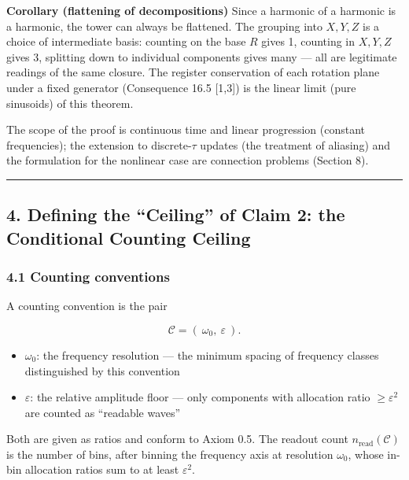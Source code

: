 \documentclass[
  a4paper,
]{article}
\providecommand{\tightlist}{%
  \setlength{\itemsep}{0pt}\setlength{\parskip}{0pt}}
\begin{document}
\textbf{Corollary (flattening of decompositions)} Since a harmonic of a
harmonic is a harmonic, the tower can always be flattened. The grouping
into \(X,Y,Z\) is a choice of intermediate basis: counting on the base
\(R\) gives 1, counting in \(X,Y,Z\) gives 3, splitting down to
individual components gives many --- all are legitimate readings of the
same closure. The register conservation of each rotation plane under a
fixed generator (Consequence 16.5 {[}1,3{]}) is the linear limit (pure
sinusoids) of this theorem.

The scope of the proof is continuous time and linear progression
(constant frequencies); the extension to discrete-\(\tau\) updates (the
treatment of aliasing) and the formulation for the nonlinear case are
connection problems (Section 8).

\begin{center}\rule{0.5\linewidth}{0.5pt}\end{center}

\subsection{4. Defining the ``Ceiling'' of Claim 2: the Conditional
Counting
Ceiling}\label{defining-the-ceiling-of-claim-2-the-conditional-counting-ceiling}

\subsubsection{4.1 Counting conventions}\label{counting-conventions}

A counting convention is the pair

\[
\mathcal C=(\ \omega_0,\ \varepsilon\ ).
\]

\begin{itemize}
\tightlist
\item
  \(\omega_0\): the frequency resolution --- the minimum spacing of
  frequency classes distinguished by this convention
\item
  \(\varepsilon\): the relative amplitude floor --- only components with
  allocation ratio \(\ge\varepsilon^2\) are counted as ``readable
  waves''
\end{itemize}

Both are given as ratios and conform to Axiom 0.5. The readout count
\(n_{\mathrm{read}}(\mathcal C)\) is the number of bins, after binning
the frequency axis at resolution \(\omega_0\), whose in-bin allocation
ratios sum to at least \(\varepsilon^2\).
\end{document}
